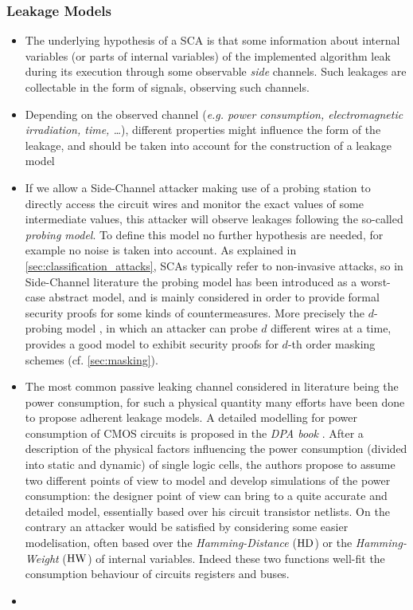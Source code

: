 \subsubsection{Leakage Models}
\begin{itemize}


\item The underlying hypothesis of a SCA is that some information about internal variables (or parts of internal variables) of the implemented algorithm leak during its execution through some observable \emph{side} channels. Such leakages are collectable in the form of signals, observing such channels. 

\item Depending on the observed channel (\emph{e.g. power consumption, electromagnetic irradiation, time, \dots}), different properties might influence the form of the leakage, and should be taken into account for the construction of a leakage model
\item If we allow a Side-Channel attacker making use of a probing station to directly access the circuit wires and monitor the exact values of some intermediate values, this attacker will observe leakages following the so-called \emph{probing model}. To define this model no further hypothesis are needed, for example no noise is taken into account. As explained in \ref{sec:classification_attacks}, SCAs typically refer to non-invasive attacks, so in Side-Channel literature the probing model has been introduced as a worst-case abstract model, and is mainly considered in order to provide formal security proofs for some kinds of countermeasures. More precisely the $d$-probing model \cite{ishai2003private}, in which an attacker can probe $d$ different wires at a time, provides a good model to exhibit security proofs for $d$-th order masking schemes (cf. \ref{sec:masking}). 
\item The most common passive leaking channel considered in literature being the power consumption, for such a physical quantity many efforts have been done to propose adherent leakage models. A detailed modelling for power consumption of CMOS circuits is proposed in the \emph{DPA book} \cite{mangard2008power}. After a description of the physical factors influencing the power consumption (divided into static and dynamic) of single logic cells, the authors propose to assume two different points of view to model and develop simulations of the power consumption: the designer point of view can bring to a quite accurate and detailed model, essentially based over his circuit transistor netlists. On the contrary an attacker would be satisfied by considering some easier modelisation, often based over the \emph{Hamming-Distance} ($\mathrm{HD}$) or the \emph{Hamming-Weight} ($\mathrm{HW}$) of internal variables. Indeed these two functions well-fit the consumption behaviour of circuits registers and buses. 
\item 
\end{itemize}





